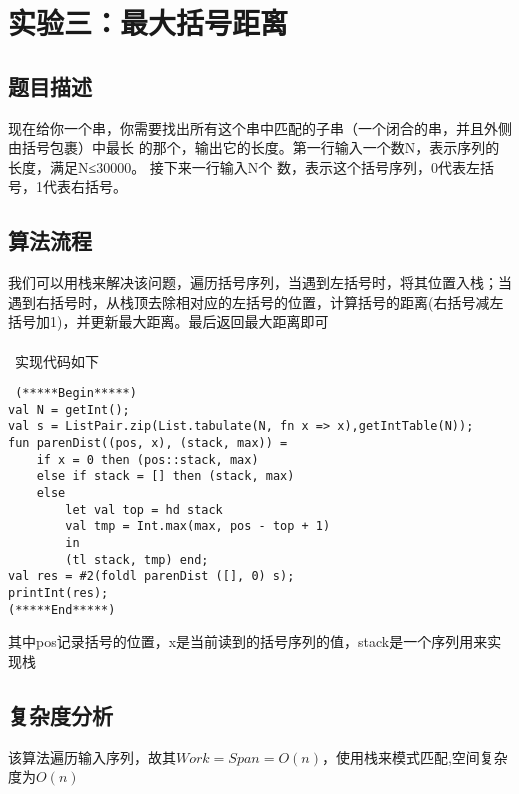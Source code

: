 \documentclass[UTF8,a4paperdui, %
]{ctexart}
\begin{document}
\newpage
\section{实验三：最大括号距离}

\subsection{题目描述}
现在给你一个串，你需要找出所有这个串中匹配的子串（一个闭合的串，并且外侧由括号包裹）中最长
的那个，输出它的长度。第一行输入一个数N，表示序列的长度，满足N≤30000。 接下来一行输入N个
数，表示这个括号序列，0代表左括号，1代表右括号。

\subsection{算法流程}
我们可以用栈来解决该问题，遍历括号序列，当遇到左括号时，将其位置入栈；当遇到右括号时，从栈顶去除相对应的左括号的位置，计算括号的距离(右括号减左括号加1)，并更新最大距离。最后返回最大距离即可\\
\\\
实现代码如下
\begin{lstlisting}
 (*****Begin*****)			 
val N = getInt();   
val s = ListPair.zip(List.tabulate(N, fn x => x),getIntTable(N));
fun parenDist((pos, x), (stack, max)) =
    if x = 0 then (pos::stack, max) 
    else if stack = [] then (stack, max)
    else
        let val top = hd stack
        val tmp = Int.max(max, pos - top + 1)
        in
        (tl stack, tmp) end; 
val res = #2(foldl parenDist ([], 0) s);
printInt(res);
(*****End*****)
\end{lstlisting}
其中pos记录括号的位置，x是当前读到的括号序列的值，stack是一个序列用来实现栈
\subsection{复杂度分析}
该算法遍历输入序列，故其$Work=Span=O(n)$，使用栈来模式匹配,空间复杂度为$O(n)$
\end{document}
